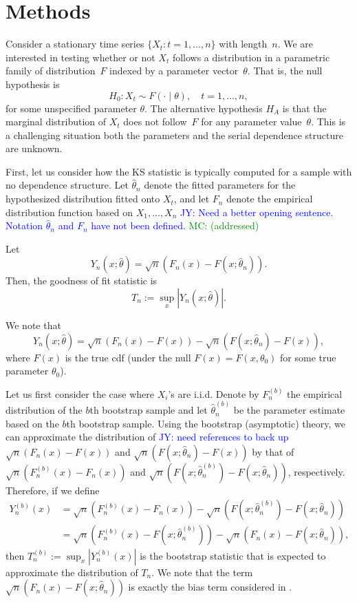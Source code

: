 \documentclass[12pt, titlepage, letterpaper]{article}
\newcommand{\jy}[1]{\textcolor{blue}{JY: #1}}
\newcommand{\mc}[1]{\textcolor{green}{MC: (#1)}}
\begin{document}
{\section{Methods}
\label{sec:methods}


Consider a stationary time series $\{X_t: t = 1, \ldots, n\}$ with length~$n$.
We are interested in testing whether or not $X_t$ follows a distribution in a
parametric family of distribution~$F$ indexed by a parameter
vector~$\theta$. That is, the null hypothesis is
\[
  H_0: X_t \sim F(\cdot \mid \theta), \quad t = 1, \ldots, n,
\]
for some unspecified parameter $\theta$.
The alternative hypothesis $H_A$ is that the marginal distribution of $X_t$ does
not follow~$F$ for any parameter value~$\theta$. This is a challenging situation
both the parameters and the serial dependence structure are unknown.


First, let us consider how the KS statistic is typically computed for a sample
with no dependence structure.
Let $\hat\theta_n$ denote the fitted parameters for the hypothesized 
distribution fitted onto $X_t$, and let 
$F_n$ denote the empirical distribution function based on $X_1,...,X_n$
\jy{Need a better opening sentence. Notation $\hat\theta_n$ and $F_n$ have
  not been defined.}
\mc{addressed}

Let
\begin{equation*}
Y_n(x; \hat\theta) = \sqrt{n}(F_n(x) - F(x; \hat\theta_n)).
\end{equation*}
Then, the
goodness of fit statistic is 
\begin{equation*}
T_n := \sup_x|Y_n(x; \hat\theta)|.
\end{equation*}

We note that
\begin{equation*}
Y_n(x; \hat\theta) = \sqrt{n}(F_n(x) - F(x)) - 
\sqrt{n}(F(x; \hat\theta_n) - F(x)),
\end{equation*}
where $F(x)$ is the true cdf (under the null $F(x) = F(x, \theta_0)$ for some
true parameter $\theta_0$).


Let us first consider the case where $X_i$'s are i.i.d. Denote by $F^{(b)}_n$ 
the empirical distribution of the $b$th bootstrap sample and let
$\hat\theta^{(b)}_n$ be the parameter estimate based on the $b$th bootstrap 
sample. 
Using the bootstrap (asymptotic) theory, we can approximate the distribution of
\jy{need references to back up}
$\sqrt{n}(F_n(x) - F(x))$ and $\sqrt{n}(F(x; \hat\theta_n) - F(x))$
by that of $\sqrt{n}(F^{(b)}_n(x) - F_n(x))$
and
$\sqrt{n}(F(x; \hat\theta^{(b)}_n) - F(x; \hat\theta_n))$, respectively.
Therefore, if we define
\begin{align*}
Y^{(b)}_n(x) &= \sqrt{n}(F^{(b)}_n(x) - F_n(x)) - 
               \sqrt{n}(F(x; \hat\theta^{(b)}_n) - F(x; \hat\theta_n)) \\
             &= \sqrt{n}(F^{(b)}_n(x) - F(x; \hat\theta^{(b)}_n)) - 
               \sqrt{n}(F_n(x) - F(x; \hat\theta_n)),
\end{align*}
then $T^{(b)}_n := \sup_x|Y^{(b)}_n(x)|$ is the bootstrap statistic that is 
expected
to approximate the distribution of $T_n$. We note that the term
$\sqrt{n}(F_n(x) - F(x; \hat\theta_n))$ is exactly the bias term considered in 
\citet{babu2004goodness}.


}
\end{document}
